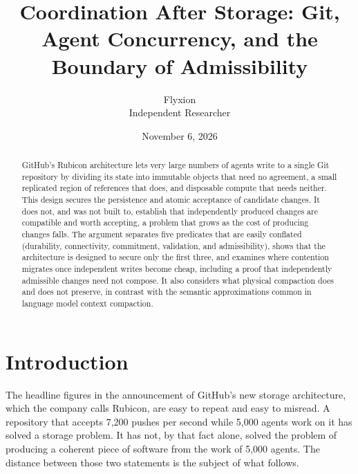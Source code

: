 \documentclass[11pt]{article}
\title{Coordination After Storage: Git, Agent Concurrency, and the Boundary of Admissibility}
\author{Flyxion\\Independent Researcher}
\date{November 6, 2026}
\theoremstyle{definition}
\theoremstyle{plain}
\begin{document}
\maketitle

\begin{abstract}
GitHub's Rubicon architecture lets very large numbers of agents write to a single Git repository by dividing its state into immutable objects that need no agreement, a small replicated region of references that does, and disposable compute that needs neither. This design secures the persistence and atomic acceptance of candidate changes. It does not, and was not built to, establish that independently produced changes are compatible and worth accepting, a problem that grows as the cost of producing changes falls. The argument separates five predicates that are easily conflated (durability, connectivity, commitment, validation, and admissibility), shows that the architecture is designed to secure only the first three, and examines where contention migrates once independent writes become cheap, including a proof that independently admissible changes need not compose. It also considers what physical compaction does and does not preserve, in contrast with the semantic approximations common in language model context compaction.
\end{abstract}

\section{Introduction}

The headline figures in the announcement of GitHub's new storage architecture, which the company calls Rubicon, are easy to repeat and easy to misread. A repository that accepts 7,200 pushes per second while 5,000 agents work on it has solved a storage problem. It has not, by that fact alone, solved the problem of producing a coherent piece of software from the work of 5,000 agents. The distance between those two statements is the subject of what follows.
\end{document}

